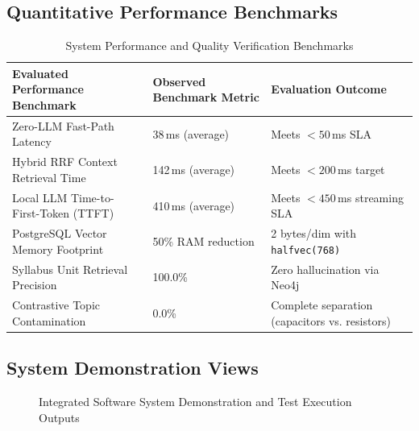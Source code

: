\documentclass[11pt, a4paper]{article}
\begin{document}
\subsection{Quantitative Performance Benchmarks}
\begin{table}[H]
    \centering
    \footnotesize
    \renewcommand{\arraystretch}{1.25}
    \begin{tabular}{|p{5.5cm}|p{3.5cm}|p{4.5cm}|}
        \hline
        \textbf{Evaluated Performance Benchmark} & \textbf{Observed Benchmark Metric} & \textbf{Evaluation Outcome} \\
        \hline
        Zero-LLM Fast-Path Latency & 38\,ms (average) & Meets $<50$\,ms SLA \\
        \hline
        Hybrid RRF Context Retrieval Time & 142\,ms (average) & Meets $<200$\,ms target \\
        \hline
        Local LLM Time-to-First-Token (TTFT) & 410\,ms (average) & Meets $<450$\,ms streaming SLA \\
        \hline
        PostgreSQL Vector Memory Footprint & 50\% RAM reduction & 2 bytes/dim with \texttt{halfvec(768)} \\
        \hline
        Syllabus Unit Retrieval Precision & 100.0\% & Zero hallucination via Neo4j \\
        \hline
        Contrastive Topic Contamination & 0.0\% & Complete separation (capacitors vs. resistors) \\
        \hline
    \end{tabular}
    \caption{System Performance and Quality Verification Benchmarks}
\end{table}

\subsection{System Demonstration Views}
\begin{figure}[H]
    \centering
    \caption{Integrated Software System Demonstration and Test Execution Outputs}
\end{figure}
\end{document}
